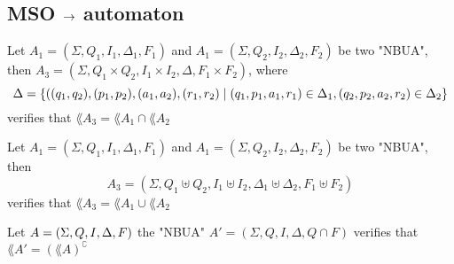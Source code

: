 \documentclass{article}
\begin{document}
\subsection{MSO $\rightarrow$ automaton}

\begin{lemma}
	Let $A_1 = (\Sigma, Q_1, I_1, \Delta_1, F_1)$ and $A_1 = (\Sigma, Q_2, I_2, \Delta_2, F_2)$ be two "NBUA", then
	$A_3 =  (\Sigma, Q_1 \times Q_2, I_1 \times I_2, \Delta , F_1 \times F_2)$, where
	\[\Delta = \left\{((q_1,q_2) , (p_1,p_2), (a_1,a_2), (r_1,r_2) \mid  (q_1,p_1,a_1,r_1) \in \Delta_1, (q_2,p_2,a_2,r_2) \in \Delta_2\right\}\]
	verifies that $\lang {A_3} = \lang {A_1} \cap \lang {A_2}$
\end{lemma}

\begin{lemma}
	Let $A_1 = (\Sigma, Q_1, I_1, \Delta_1, F_1)$ and $A_1 = (\Sigma, Q_2, I_2, \Delta_2, F_2)$ be two "NBUA", then
	\[ A_3 = (\Sigma, Q_1 \uplus Q_2, I_1 \uplus I_2, \Delta_1 \uplus \Delta_2, F_1 \uplus F_2) \]
	verifies that $\lang {A_3} = \lang {A_1} \cup \lang {A_2}$
\end{lemma}

\begin{lemma}
	Let $A = (\Sigma, Q, I, \Delta, F)$ the "NBUA" $A' = (\Sigma, Q, I, \Delta, Q \cap F)$
	verifies that $\lang {A'} = (\lang A )^{\complement}$
\end{lemma}
\end{document}
